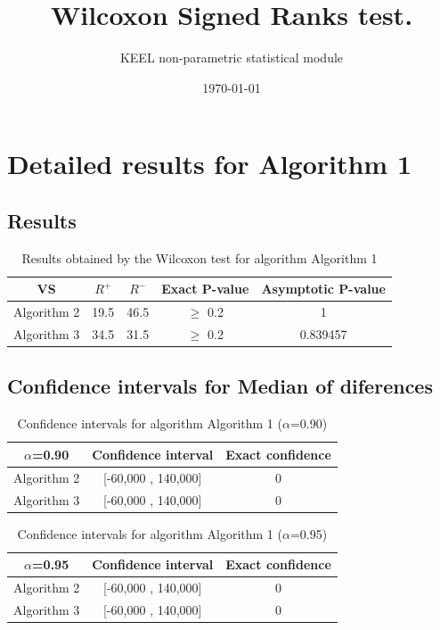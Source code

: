\documentclass[a4paper,10pt]{article}
\title{Wilcoxon Signed Ranks test.}
\date{\today}
\author{KEEL non-parametric statistical module}
\begin{document}
\pagestyle{empty}
\maketitle
\thispagestyle{empty}



\section{Detailed results for Algorithm 1}


\subsection{Results}

\begin{table}[!htp]
\centering\small
\begin{tabular}{
|c|c|c|c|c|}
\hline
 VS & $R^{+}$ & $R^{-}$ & Exact P-value & Asymptotic P-value \\ \hline 
Algorithm 2 & 19.5 & 46.5 & $\geq$ 0.2 & 1\\ \hline 
Algorithm 3 & 34.5 & 31.5 & $\geq$ 0.2 & 0.839457\\ \hline 

\end{tabular}
\caption{Results obtained by the Wilcoxon test for algorithm Algorithm 1}
\end{table}

\subsection{Confidence intervals for Median of diferences}

\begin{table}[!htp]
\centering\small
\begin{tabular}{
|c|c|c|}
\hline
 $\alpha$=0.90 & Confidence interval & Exact confidence \\ \hline 
Algorithm 2 & [-60,000 , 140,000] & 0\\ \hline 
Algorithm 3 & [-60,000 , 140,000] & 0\\ \hline 

\end{tabular}
\caption{Confidence intervals for algorithm Algorithm 1 ($\alpha$=0.90)}
\end{table}
\begin{table}[!htp]
\centering\small
\begin{tabular}{
|c|c|c|}
\hline
 $\alpha$=0.95 & Confidence interval & Exact confidence \\ \hline 
Algorithm 2 & [-60,000 , 140,000] & 0\\ \hline 
Algorithm 3 & [-60,000 , 140,000] & 0\\ \hline 

\end{tabular}
\caption{Confidence intervals for algorithm Algorithm 1 ($\alpha$=0.95)}
\end{table}
\end{document}
